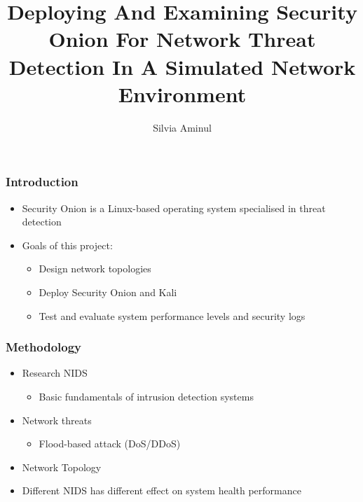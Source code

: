 \documentclass[12pt]{beamer}
\begin{document}
	\author{Silvia Aminul}
	\title{Deploying And Examining Security Onion For Network Threat Detection In A Simulated Network Environment}
	\begin{frame}[plain]
		\maketitle
	\end{frame}
	
	\begin{frame}
		\frametitle{Introduction}
		\begin{itemize}
			\item Security Onion is a Linux-based operating system specialised in threat detection
			\item Goals of this project:
			\begin{itemize}
				\item Design network topologies 
				\item Deploy Security Onion and Kali 
				\item Test and evaluate system performance levels and security logs
			\end{itemize}
		\end{itemize}
	\end{frame}
	
	
	
	
	
	\begin{frame}
		\frametitle{Methodology}
		\begin{itemize}
			\item Research NIDS
			\begin{itemize}
				\item Basic fundamentals of intrusion detection systems
			\end{itemize}
			\item Network threats 
			\begin{itemize}
				\item Flood-based attack (DoS/DDoS)
				
			\end{itemize}
			\item Network Topology 

				\item Different NIDS has different effect on system health performance 

		\end{itemize}
	\end{frame}
	
\end{document}
